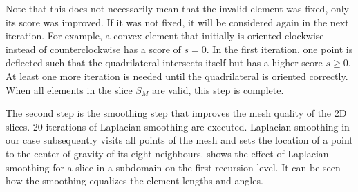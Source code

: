 Note that this does not necessarily mean that the invalid element was fixed, only its score was improved. If it was not fixed, it will be considered again in the next iteration. For example, a convex element that initially is oriented clockwise instead of counterclockwise has a score of $s=0$. In the first iteration, one point is deflected such that the quadrilateral intersects itself but has a higher score $s\geq 0$. At least one more iteration is needed until the quadrilateral is oriented correctly.
When all elements in the slice $S_M$ are valid, this step is complete.

The second step is the smoothing step that improves the mesh quality of the 2D slices. \num{20} iterations of Laplacian smoothing \cite{field1988laplacianSmoothingAndDelaunayTriangulations} are executed. Laplacian smoothing in our case subsequently visits all points of the mesh and sets the location of a point to the center of gravity of its eight neighbours.  shows the effect of Laplacian smoothing for a slice in a subdomain on the first recursion level. It can be seen how the smoothing equalizes the element lengths and angles.

